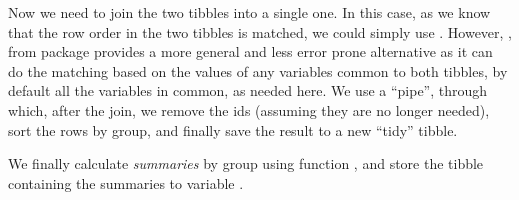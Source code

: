 \documentclass[krantz2]{krantz}\usepackage{knitr}%
\begin{document}
Now we need to join the two tibbles into a single one. In this case, as we know that the row order in the two tibbles is matched, we could simply use . However, , from package  provides a more general and less error prone alternative as it can do the matching based on the values of any variables common to both tibbles, by default all the variables in common, as needed here. We use a ``pipe'', through which, after the join, we remove the ids (assuming they are no longer needed), sort the rows by group, and finally save the result to a new ``tidy'' tibble.

\begin{knitrout}\footnotesize
{}\color{fgcolor}
\end{knitrout}

We finally calculate \emph{summaries} by group using function , and store the tibble containing the summaries to variable .
\end{document}
